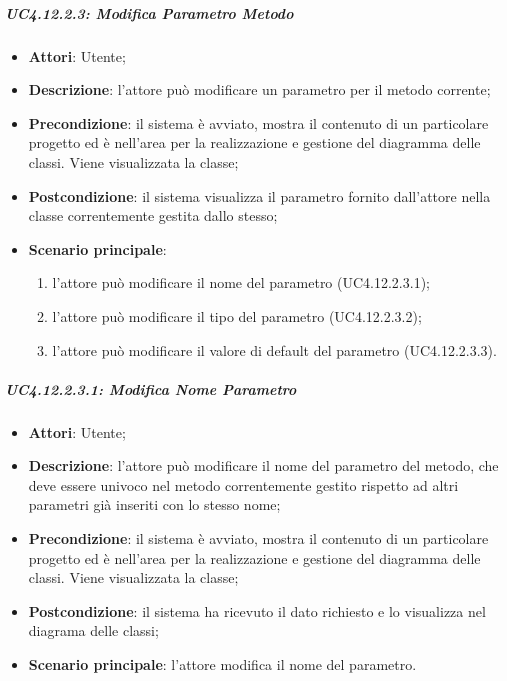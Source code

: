 \subparagraph{UC4.12.2.3: Modifica Parametro Metodo}
\label{UC4.12.2.3}
\begin{itemize}
	\item \textbf{Attori}: Utente;
	\item \textbf{Descrizione}: l'attore può modificare un parametro per il metodo corrente;
	\item \textbf{Precondizione}:  il sistema è avviato, mostra il contenuto di un particolare progetto ed è nell'area per la realizzazione e gestione del diagramma delle classi. Viene visualizzata la classe;
	\item \textbf{Postcondizione}: il sistema visualizza il parametro fornito dall'attore nella classe correntemente gestita dallo stesso;
	\item \textbf{Scenario principale}:
	\begin{enumerate}
		\item l'attore può modificare il nome del parametro (UC4.12.2.3.1);
		\item l'attore può modificare il tipo del parametro (UC4.12.2.3.2);
		\item l'attore può modificare il valore di default del parametro (UC4.12.2.3.3).
	\end{enumerate}
\end{itemize}

\subparagraph{UC4.12.2.3.1: Modifica Nome Parametro}
\label{UC4.12.2.3.1}
\begin{itemize}
	\item \textbf{Attori}: Utente;
	\item \textbf{Descrizione}: l'attore può modificare il nome del parametro del metodo, che deve essere univoco nel metodo correntemente gestito rispetto ad altri parametri già inseriti con lo stesso nome;
	\item \textbf{Precondizione}: il sistema è avviato, mostra il contenuto di un particolare progetto ed è nell'area per la realizzazione e gestione del diagramma delle classi. Viene visualizzata la classe;
	\item \textbf{Postcondizione}: il sistema ha ricevuto il dato richiesto e lo visualizza nel diagrama delle classi;
	\item \textbf{Scenario principale}: l'attore modifica il nome del parametro.
\end{itemize}

